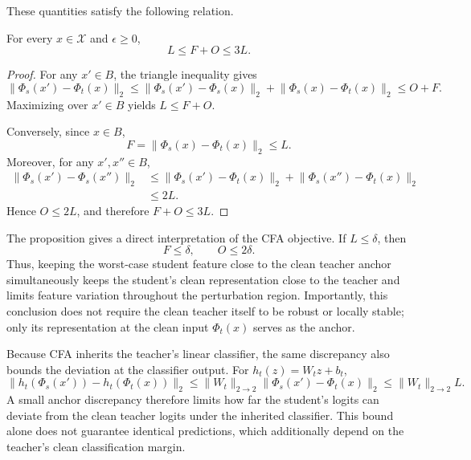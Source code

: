 These quantities satisfy the following relation.

\begin{proposition}
\label{prop:decomp}
For every \(x\in\mathcal X\) and \(\epsilon\ge0\),
\begin{equation}
L
\le
F+O
\le
3L.
\label{eqn:decomp}
\end{equation}
\end{proposition}

\begin{proof}
For any \(x'\in B\), the triangle inequality gives
\[
\lVert\Phi_s(x')-\Phi_t(x)\rVert_2
\le
\lVert\Phi_s(x')-\Phi_s(x)\rVert_2
+
\lVert\Phi_s(x)-\Phi_t(x)\rVert_2
\le
O+F.
\]
Maximizing over \(x'\in B\) yields \(L\le F+O\).

Conversely, since \(x\in B\),
\[
F
=
\lVert\Phi_s(x)-\Phi_t(x)\rVert_2
\le L.
\]
Moreover, for any \(x',x''\in B\),
\[
\begin{aligned}
\lVert\Phi_s(x')-\Phi_s(x'')\rVert_2
&\le
\lVert\Phi_s(x')-\Phi_t(x)\rVert_2
+
\lVert\Phi_s(x'')-\Phi_t(x)\rVert_2 \\
&\le
2L.
\end{aligned}
\]
Hence \(O\le2L\), and therefore \(F+O\le3L\).
\end{proof}

The proposition gives a direct interpretation of the CFA objective.
If \(L\le\delta\), then
\[
F\le\delta,
\qquad
O\le2\delta.
\]
Thus, keeping the worst-case student feature close to the clean teacher anchor
simultaneously keeps the student's clean representation close to the teacher
and limits feature variation throughout the perturbation region.
Importantly, this conclusion does not require the clean teacher itself to be
robust or locally stable; only its representation at the clean input
\(\Phi_t(x)\) serves as the anchor.

Because CFA inherits the teacher's linear classifier, the same discrepancy
also bounds the deviation at the classifier output.
For \(h_t(z)=W_tz+b_t\),
\begin{equation}
\lVert
h_t(\Phi_s(x'))
-
h_t(\Phi_t(x))
\rVert_2
\le
\lVert W_t\rVert_{2\rightarrow2}
\lVert
\Phi_s(x')-\Phi_t(x)
\rVert_2
\le
\lVert W_t\rVert_{2\rightarrow2}L.
\end{equation}
A small anchor discrepancy therefore limits how far the student's logits can
deviate from the clean teacher logits under the inherited classifier.
This bound alone does not guarantee identical predictions, which additionally
depend on the teacher's clean classification margin.

